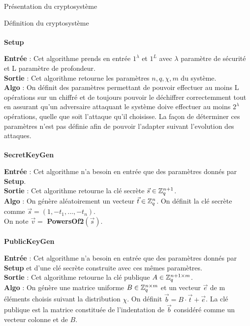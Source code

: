 \begin{section}{Présentation du cryptosystème}
\begin{subsection}{Définition du cryptosystème}
	\paragraph{}
	\textbf{Setup}
	\flushleft

	\textbf{Entrée} : Cet algorithme prends en entrée $1^\lambda$ et $1^L$ avec $\lambda$ paramètre de sécurité et L paramètre de profondeur. \\
	\textbf{Sortie} : Cet algorithme retourne les paramètres $n, q, \chi, m$ du système. \\
	\textbf{Algo} : On définit des paramètres permettant de pouvoir effectuer au moins L opérations sur un chiffré et de toujours pouvoir le déchiffrer correctemment tout en assurant qu'un adversaire attaquant le système doive effectuer au moins $2^\lambda$ opérations, quelle que soit l'attaque qu'il choisisse. La façon de déterminer ces paramètres n'est pas définie afin de pouvoir l'adapter suivant l'evolution des attaques. \\
	
	\paragraph{}
	\textbf{SecretKeyGen}
	\flushleft
	
	\textbf{Entrée} : Cet algorithme n'a besoin en entrée que des paramètres donnés par \textbf{Setup}. \\
	\textbf{Sortie} : Cet algorithme retourne la clé secrète $\vec{s} \in \mathbb{Z}_q^{n+1}$. \\
	\textbf{Algo} : On génère aléatoirement un vecteur $\vec{t} \in \mathbb{Z}_q^n$. On définit la clé secrète comme $\vec{s} = (1, -t_1, ..., -t_n)$. \\
	On note $\vec{v} = $ \textbf{PowersOf2}$(\vec{s})$.
	
	\paragraph{}
	\textbf{PublicKeyGen}
	\flushleft
	
	\textbf{Entrée} : Cet algorithme n'a besoin en entrée que des paramètres donnés par \textbf{Setup} et d'une clé secrète construite avec ces mêmes paramètres. \\
	\textbf{Sortie} : Cet algorithme retourne la clé publique $A \in \mathbb{Z}_q^{n+1 \times m}$.\\
	\textbf{Algo} : On génère une matrice uniforme $B \in \mathbb{Z}_q^{n \times m}$ et un vecteur $\vec{e}$ de m éléments choisis suivant la distribution $\chi$. On définit $\vec{b} = B \cdot \vec{t} + \vec{e}$. La clé publique est la matrice constituée de l'indentation de $\vec{b}$ considéré comme un vecteur colonne et de $B$.
	

\end{subsection}
\end{section}
